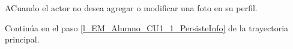\begin{UCtrayectoriaA}{A}{Cuando el actor no desea agregar o modificar
una foto en su perfil.}

	\UCpaso Continúa en el paso \ref{l_EM_Alumno_CU1_1_PersisteInfo} de la trayectoria principal.

\end{UCtrayectoriaA}


